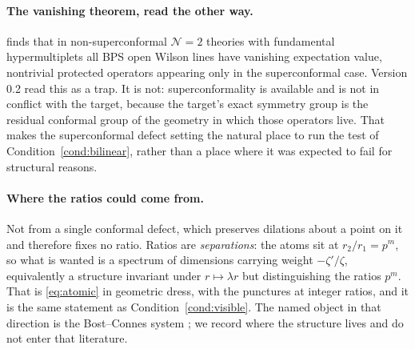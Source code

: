 \paragraph{The vanishing theorem, read the other way.}
\cite{OWL} finds that in non-superconformal $\mathcal N=2$ theories with
fundamental hypermultiplets all BPS open Wilson lines have vanishing expectation
value, nontrivial protected operators appearing only in the superconformal case.
Version 0.2 read this as a trap. It is not: superconformality is available and is
not in conflict with the target, because the target's exact symmetry group is the
residual conformal group of the geometry in which those operators live. That
makes the superconformal defect setting the natural place to run the test of
Condition~\ref{cond:bilinear}, rather than a place where it was expected to fail
for structural reasons.

\paragraph{Where the ratios could come from.} Not from a single conformal defect,
which preserves dilations about a point on it and therefore fixes no ratio.
Ratios are \emph{separations}: the atoms sit at $r_2/r_1=p^m$, so what is wanted
is a spectrum of dimensions carrying weight $-\zeta'/\zeta$, equivalently a
structure invariant under $r\mapsto\lambda r$ but distinguishing the ratios
$p^m$. That is \eqref{eq:atomic} in geometric dress, with the punctures at
integer ratios, and it is the same statement as Condition~\ref{cond:visible}. The
named object in that direction is the Bost--Connes system \cite{BostConnes}; we
record where the structure lives and do not enter that literature.
